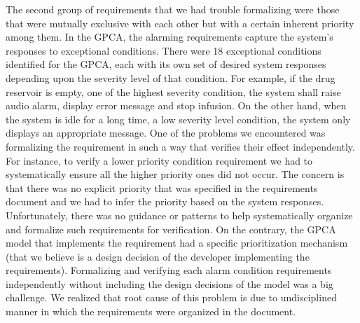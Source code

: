 The second group of requirements that we had trouble formalizing were those that were mutually exclusive with each other but with a certain inherent priority among them. In the GPCA, the alarming requirements capture the system's responses to exceptional conditions. There were 18 exceptional conditions identified for the GPCA, each with its own set of desired system responses depending upon the severity level of that condition. For example, if the drug reservoir is empty, one of the highest severity condition, the system shall raise audio alarm, display error message and stop infusion. On the other hand, when the system is idle for a long time, a low severity level condition, the system only displays an appropriate message. One of the problems we encountered was formalizing the requirement in such a way that verifies their effect independently. For instance, to verify a lower priority condition requirement we had to systematically ensure all the higher priority ones did not occur. The concern is that there was no explicit priority that was specified in the requirements document and we had to infer the priority based on the system responses. Unfortunately, there was no guidance or patterns to help systematically organize and formalize such requirements for verification. On the contrary, the GPCA model that implements the requirement had a specific prioritization mechanism (that we believe is a design decision of the developer implementing the requirements). Formalizing and verifying each alarm condition requirements independently without including the design decisions of the model was a big challenge. We realized that root cause of this problem is due to undisciplined manner in which the requirements were organized in the document.
